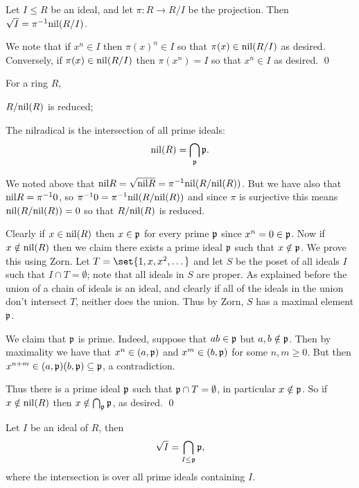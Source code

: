 \bprop

    Let $I\leq R$ be an ideal, and let $\pi\colon R\to R/I$ be the projection.
    Then $\sqrt I=\pi^{-1}{\rm nil}(R/I)$.

\eprop

\bproof

    We note that if $x^n\in I$ then $\pi(x)^n\in I$ so that $\pi(x)\in{\rm nil}(R/I)$ as desired.
    Conversely, if $\pi(x)\in{\rm nil}(R/I)$ then $\pi(x^n)=I$ so that $x^n\in I$ as desired.
    \qed

\eproof

\bprop

    For a ring $R$,
    \benum
        \item $R/{\rm nil}(R)$ is reduced;
        \item The nilradical is the intersection of all prime ideals:
        $$ {\rm nil}(R) = \bigcap_{{\frak p}}{{\frak p}} . $$
    \eenum

\eprop

\bproof

    We noted above that ${\rm nil} R=\sqrt{{\rm nil} R}=\pi^{-1}{\rm nil}(R/{\rm nil}(R))$.
    But we have also that ${\rm nil} R=\pi^{-1}0$, so $\pi^{-1}0=\pi^{-1}{\rm nil}(R/{\rm nil}(R))$ and since $\pi$ is surjective this means ${\rm nil}(R/{\rm nil}(R))=0$
    so that $R/{\rm nil}(R)$ is reduced.

    Clearly if $x\in{\rm nil}(R)$ then $x\in{{\frak p}}$ for every prime ${{\frak p}}$ since $x^n=0\in{{\frak p}}$.
    Now if $x\notin{\rm nil}(R)$ then we claim there exists a prime ideal ${{\frak p}}$ such that $x\notin{{\frak p}}$.
    We prove this using Zorn.
    Let $T=\set{1,x,x^2,\dots}$ and let $S$ be the poset of all ideals $I$ such that $I\cap T=\emptyset$; note that all ideals in $S$ are proper.
    As explained before the union of a chain of ideals is an ideal, and clearly if all of the ideals in the union don't intersect $T$, neither
    does the union.
    Thus by Zorn, $S$ has a maximal element ${{\frak p}}$.

    We claim that ${{\frak p}}$ is prime.
    Indeed, suppose that $ab\in{{\frak p}}$ but $a,b\notin{{\frak p}}$.
    Then by maximality we have that $x^n\in(a,{{\frak p}})$ and $x^m\in(b,{{\frak p}})$ for some $n,m\geq0$.
    But then $x^{n+m}\in(a,{{\frak p}})(b,{{\frak p}})\subseteq{{\frak p}}$, a contradiction.

    Thus there is a prime ideal ${{\frak p}}$ such that ${{\frak p}}\cap T=\emptyset$, in particular $x\notin{{\frak p}}$.
    So if $x\notin{\rm nil}(R)$ then $x\notin\bigcap_{{\frak p}}{{\frak p}}$, as desired.
    \qed

\eproof

\bcoro

    Let $I$ be an ideal of $R$, then
    $$ \sqrt I = \bigcap_{I\leq{{\frak p}}}{{\frak p}} , $$
    where the intersection is over all prime ideals containing $I$.

